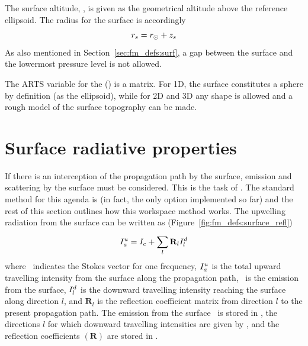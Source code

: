 The surface altitude, , is given as the geometrical altitude above the
reference ellipsoid. The radius for the surface is accordingly
\begin{equation}
  r_{s} = r_{\odot} + z_{s}
 \label{eq:fm_defs:zsurface}
\end{equation}
As also mentioned in Section~\ref{sec:fm_defs:surf}, a gap between the surface
and the lowermost pressure level is not allowed.

The ARTS variable for the  ()
is a matrix. For 1D, the surface constitutes a sphere by definition (as the
ellipsoid), while for 2D and 3D any shape is allowed and a rough model of the
surface topography can be made.



\section{Surface radiative properties}
\label{sec:fm_defs:surface}

If there is an interception of the propagation path by the surface, emission
and scattering by the surface must be considered. This is the task of
. The standard method for this agenda is
 (in fact, the only option implemented so far)
and the rest of this section outlines how this workspace method works. The
upwelling radiation from the surface can be written as
(Figure~\ref{fig:fm_defs:surface_refl})
\begin{equation}
  I_{a}^u = I_{e} + \sum_l^{} \mathbf{R}_l I_{l}^d
  \label{eq:fm_defs:surfacerefl}
\end{equation}
where \StoI\ indicates the Stokes vector for one frequency, $I_{a}^u$ is
the total upward travelling intensity from the surface along the propagation
path, \ is the emission from the surface, $I_{l}^d$ is the
downward travelling intensity reaching the surface along direction $l$, and
$\mathbf{R}_l$ is the reflection coefficient matrix from direction $l$ to the
present propagation path. The emission from the surface \ is stored
in , the directions $l$ for which downward
travelling intensities are given by , and the reflection
coefficients $(\mathbf{R})$ are stored in .

